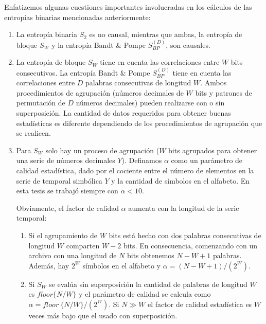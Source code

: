 Enfatizemos algunas cuestiones importantes involucradas en los cálculos de las entropías binarias mencionadas anteriormente:
\begin{enumerate}
	\item La entropía binaria $S_2$ es no causal, mientras que ambas, la entropía de bloque $S_W$ y la entropía Bandt \& Pompe $S^{(D)}_{BP}$, son causales.
	\item La entropía de bloque $S_W$ tiene en cuenta las correlaciones entre $W$ bits consecutivos.
	La entropía Bandt \& Pompe $S^{(D)}_{BP}$ tiene en cuenta las correlaciones entre $D$ palabras consecutivas de longitud $W$.
	Ambos procedimientos de agrupación (números decimales de $W$ bits y patrones de permutación de $D$ números decimales) pueden realizarse con o sin superposición.
	La cantidad de datos requeridos para obtener buenas estadísticas es diferente dependiendo de los procedimientos de agrupación que se realicen.
	\item Para $ S_W $ solo hay un proceso de agrupación ($W$ bits agrupados para obtener una serie de números decimales $Y$).
	Definamos $\alpha$ como un parámetro de calidad estadística, dado por el cociente entre el número de elementos en la serie de temporal simbólica $Y$ y la cantidad de símbolos en el alfabeto.
	En esta tesis se trabajó siempre con $\alpha < 10$.
	
	Obviamente, el factor de calidad $\alpha$ aumenta con la longitud de la serie temporal:
	\begin{enumerate}
		\item Si el agrupamiento de $W$ bits está hecho con dos palabras consecutivas de longitud $W$ comparten $W-2$ bits.
		En consecuencia, comenzando con un archivo con una longitud de $N$ bits obtenemos $N - W + 1$ palabras.
		Además, hay $2 ^ W$ símbolos en el alfabeto y $\alpha = (N - W + 1) / (2 ^ W)$.
		\item Si $S_W$ se evalúa sin superposición la cantidad de palabras de longitud $W$ es $floor\{N/W\}$ y el parámetro de calidad se calcula como $\alpha=floor~\{N/W\}/(2^W)$.
		Si $N \gg W$ el factor de calidad estadística es $W$ veces más bajo que el usado con superposición.
	\end{enumerate}
	

\end{enumerate}
